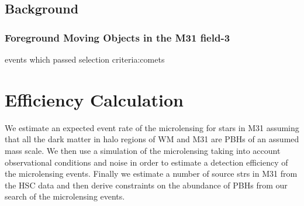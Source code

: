 \documentclass[iop, apj]{emulateapj}
\newcommand{\?}{\stackrel{?}{=}}
\begin{document}
\subsection{Background}
\subsubsection{Foreground Moving Objects in the M31 field-3}
events which passed selection criteria:comets



\section{Efficiency Calculation}
We estimate an expected event rate of the microlensing for stars in M31 assuming that all the dark matter in halo regions of WM and M31 are PBHs of an assumed mass scale. 
We then use a simulation of the microlensing taking into account observational conditions and noise in order to estimate a detection efficiency of the microlensing events. 
Finally we estimate a number of source strs in M31 from the HSC data and then derive constraints on the abundance of PBHs from our search of the microlensing events. 
\end{document}
